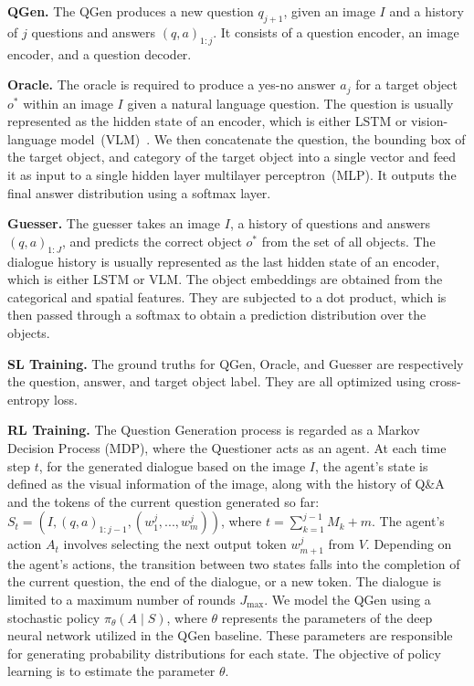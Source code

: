\textbf{QGen.} The QGen produces a new question \(q_{j+1}\), given an image \(I\) and a history of \(j\) questions and answers \((q,a)_{1:j}\). It consists of a question encoder, an image encoder, and a question decoder. 

\textbf{Oracle.} The oracle is required to produce a yes-no answer $a_j$ for a target object $o^*$ within an image $I$ given a natural language question. The question is usually represented as the hidden state of an encoder, which is either LSTM or vision-language model~(VLM)~\cite{du2022survey}. 
We then concatenate the question, the bounding box of the target object, and category of the target object into a single vector and feed it as input to a single hidden layer multilayer perceptron~(MLP).
It outputs the final answer distribution using a softmax layer.

\textbf{Guesser.} The guesser takes an image \(I\), a history of questions and answers \((q,a)_{1:J}\), and predicts the correct object \(o^*\) from the set of all objects. The dialogue history is usually represented as the last hidden state of an encoder, which is either LSTM or VLM. The object embeddings are obtained from the categorical and spatial features. 
They are subjected to a dot product, which is then passed through a softmax to obtain a prediction distribution over the objects.


\textbf{SL Training.} The ground truths for QGen, Oracle, and Guesser are respectively the question, answer, and target object label. They are all optimized using cross-entropy loss.

\textbf{RL Training.} The Question Generation process is regarded as a Markov Decision Process (MDP), where the Questioner acts as an agent. At each time step $t$, for the generated dialogue based on the image $I$, the agent's state is defined as the visual information of the image, along with the history of Q\&A and the tokens of the current question generated so far: $S_t=\left( I,(q,a)_{1:j-1},\left( w_{1}^{j},...,w_{m}^{j} \right) \right) $, where $t=\sum_{k=1}^{j-1}{M_k}+m$. The agent's action $A_t$ involves selecting the next output token $w_{m+1}^{j}$ from $V$.
Depending on the agent's actions, the transition between two states falls into the completion of the current question, the end of the dialogue, or a new token.
The dialogue is limited to a maximum number of rounds $J_{\max }$. 
We model the QGen using a stochastic policy $\pi _{\theta}(A\mid S)$, where $\theta $ represents the parameters of the deep neural network utilized in the QGen baseline. These parameters are responsible for generating probability distributions for each state. The objective of policy learning is to estimate the parameter $\theta $.

